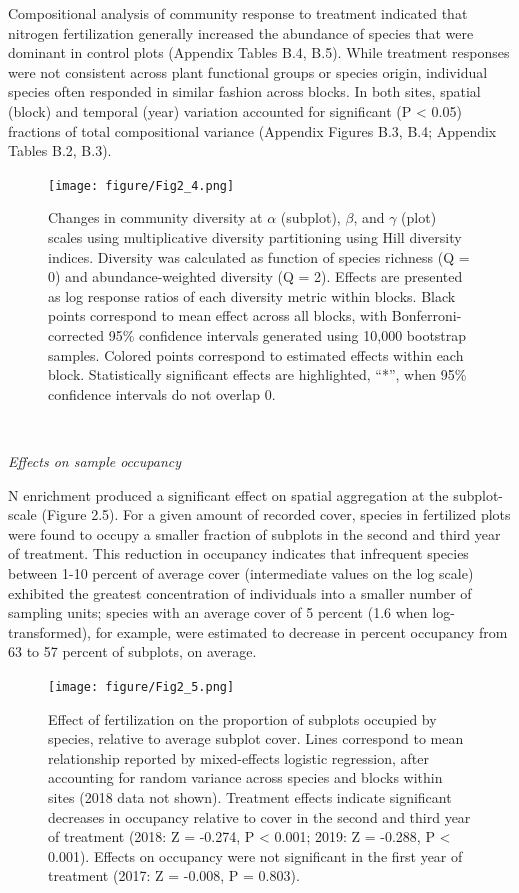 \documentclass[twoside,12pt,final]{ucthesis-CA2012}
\begin{document}
\begin{ucmainmatter}
Compositional analysis of community response to treatment indicated that nitrogen fertilization generally increased the abundance of species that were dominant in control plots (Appendix Tables B.4, B.5). While treatment responses were not consistent across plant functional groups or species origin, individual species often responded in similar fashion across blocks. In both sites, spatial (block) and temporal (year) variation accounted for significant (P \textless{} 0.05) fractions of total compositional variance (Appendix Figures B.3, B.4; Appendix Tables B.2, B.3).
\begin{figure}
\centering
\texttt{[image: figure/Fig2\_4.png]}
\caption{Changes in community diversity at \(\alpha\) (subplot), \(\beta\), and \(\gamma\) (plot) scales using multiplicative diversity partitioning using Hill diversity indices. Diversity was calculated as function of species richness (Q = 0) and abundance-weighted diversity (Q = 2). Effects are presented as log response ratios of each diversity metric within blocks. Black points correspond to mean effect across all blocks, with Bonferroni-corrected 95\% confidence intervals generated using 10,000 bootstrap samples. Colored points correspond to estimated effects within each block. Statistically significant effects are highlighted, ``*'', when 95\% confidence intervals do not overlap 0. \label{fig-2-4}}
\end{figure}
~

\emph{Effects on sample occupancy}

N enrichment produced a significant effect on spatial aggregation at the subplot-scale (Figure 2.5). For a given amount of recorded cover, species in fertilized plots were found to occupy a smaller fraction of subplots in the second and third year of treatment. This reduction in occupancy indicates that infrequent species between 1-10 percent of average cover (intermediate values on the log scale) exhibited the greatest concentration of individuals into a smaller number of sampling units; species with an average cover of 5 percent (1.6 when log-transformed), for example, were estimated to decrease in percent occupancy from 63 to 57 percent of subplots, on average.
\begin{figure}
\centering
\texttt{[image: figure/Fig2\_5.png]}
\caption{Effect of fertilization on the proportion of subplots occupied by species, relative to average subplot cover. Lines correspond to mean relationship reported by mixed-effects logistic regression, after accounting for random variance across species and blocks within sites (2018 data not shown). Treatment effects indicate significant decreases in occupancy relative to cover in the second and third year of treatment (2018: Z = -0.274, P \textless{} 0.001; 2019: Z = -0.288, P \textless{} 0.001). Effects on occupancy were not significant in the first year of treatment (2017: Z = -0.008, P = 0.803). \label{fig-2-5}}
\end{figure}
~


\end{ucmainmatter}
\end{document}
